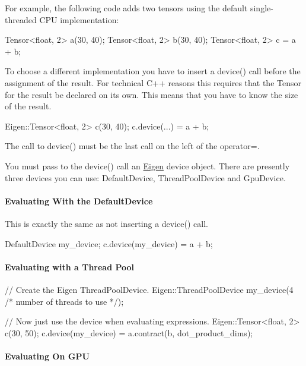 For example, the following code adds two tensors using the default single-\/threaded C\+PU implementation\+: \begin{DoxyVerb}Tensor<float, 2> a(30, 40);
Tensor<float, 2> b(30, 40);
Tensor<float, 2> c = a + b;
\end{DoxyVerb}


To choose a different implementation you have to insert a {\ttfamily device()} call before the assignment of the result. For technical C++ reasons this requires that the Tensor for the result be declared on its own. This means that you have to know the size of the result. \begin{DoxyVerb}Eigen::Tensor<float, 2> c(30, 40);
c.device(...) = a + b;
\end{DoxyVerb}


The call to {\ttfamily device()} must be the last call on the left of the operator=.

You must pass to the {\ttfamily device()} call an \hyperlink{namespace_eigen}{Eigen} device object. There are presently three devices you can use\+: Default\+Device, Thread\+Pool\+Device and Gpu\+Device.

\paragraph*{Evaluating With the Default\+Device}

This is exactly the same as not inserting a {\ttfamily device()} call. \begin{DoxyVerb}DefaultDevice my_device;
c.device(my_device) = a + b;
\end{DoxyVerb}


\paragraph*{Evaluating with a Thread Pool}

\begin{DoxyVerb}// Create the Eigen ThreadPoolDevice.
Eigen::ThreadPoolDevice my_device(4 /* number of threads to use */);

// Now just use the device when evaluating expressions.
Eigen::Tensor<float, 2> c(30, 50);
c.device(my_device) = a.contract(b, dot_product_dims);
\end{DoxyVerb}


\paragraph*{Evaluating On G\+PU}

